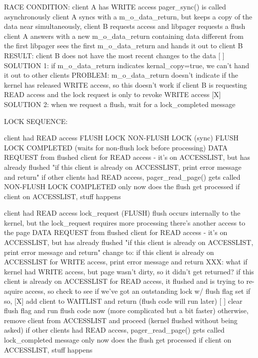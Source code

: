 \documentclass{article}
\begin{document}
RACE CONDITION:
  client A has WRITE access
  pager_sync() is called asynchronously
  client A syncs with a m_o_data_return, but keeps a copy of the data
  near simultaneously, client B requests access and libpager requests a flush
  client A answers with a new m_o_data_return containing data different from the first
  libpager sees the first m_o_data_return and hands it out to client B
  RESULT: client B does not have the most recent changes to the data
  [ ] SOLUTION 1: if m_o_data_return indicates kernal_copy=true, we can't hand it out to other clients
         PROBLEM: m_o_data_return doesn't indicate if the kernel has released WRITE access,
                  so this doesn't work if client B is requesting READ access and the lock
                  request is only to revoke WRITE access
  [X] SOLUTION 2: when we request a flush, wait for a lock_completed message


LOCK SEQUENCE:

client had READ access
FLUSH LOCK
NON-FLUSH LOCK (sync)
FLUSH LOCK COMPLETED (waits for non-flush lock before processing)
DATA REQUEST from flushed client for READ access - it's on ACCESSLIST, but has already flushed
  "if this client is already on ACCESSLIST, print error message and return"
  if other clients had READ access, pager_read_page() gets called
NON-FLUSH LOCK COMPLETED
  only now does the flush get processed
  if client on ACCESSLIST, stuff happens

client had READ access
lock_request (FLUSH)
flush occurs internally to the kernel, but the lock_request requires more processing
there's another access to the page
DATA REQUEST from flushed client for READ access - it's on ACCESSLIST, but has already flushed
  "if this client is already on ACCESSLIST, print error message and return"
  change to: if this client is already on ACCESSLIST for WRITE access, print error message and return
                XXX: what if kernel had WRITE access, but page wasn't dirty, so it didn't get returned?
             if this client is already on ACCESSLIST for READ access, it flushed and is trying to re-aquire access,
                so check to see if we've got an outstanding lock w/ flush flag set
                if so, [X] add client to WAITLIST and return (flush code will run later)
                       [ ] clear flush flag and run flush code now (more complicated but a bit faster)
                otherwise, remove client from ACCESSLIST and proceed (kernel flushed without being asked)
  if other clients had READ access, pager_read_page() gets called
lock_completed message
  only now does the flush get processed
  if client on ACCESSLIST, stuff happens
\end{document}
